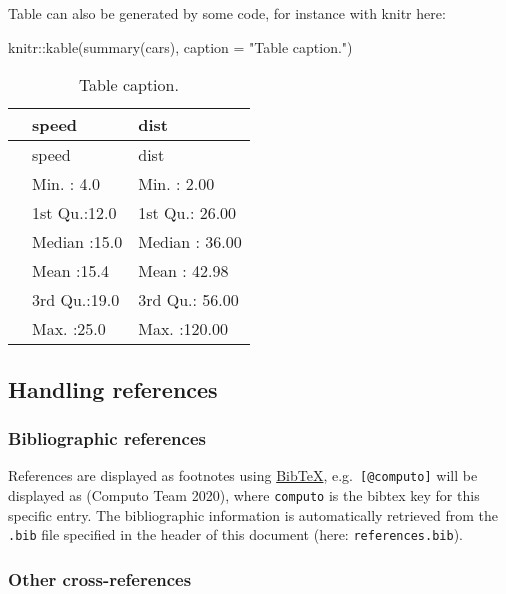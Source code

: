 \documentclass[
  11pt,
  a4paper,
]{article}
\newenvironment{Shaded}{}{}
\newcommand{\AttributeTok}[1]{\textcolor[rgb]{0.84,0.23,0.29}{#1}}
\newcommand{\FunctionTok}[1]{\textcolor[rgb]{0.44,0.26,0.76}{#1}}
\newcommand{\NormalTok}[1]{\textcolor[rgb]{0.14,0.16,0.18}{#1}}
\newcommand{\SpecialCharTok}[1]{\textcolor[rgb]{0.00,0.36,0.77}{#1}}
\newcommand{\StringTok}[1]{\textcolor[rgb]{0.01,0.18,0.38}{#1}}
\theoremstyle{plain}
\theoremstyle{remark}
\begin{document}
Table can also be generated by some code, for instance with knitr here:

\begin{Shaded}
\begin{Highlighting}[]
\NormalTok{knitr}\SpecialCharTok{::}\FunctionTok{kable}\NormalTok{(}\FunctionTok{summary}\NormalTok{(cars), }\AttributeTok{caption =} \StringTok{"Table caption."}\NormalTok{)}
\end{Highlighting}
\end{Shaded}

\begin{longtable}[]{@{}lll@{}}
\caption{Table caption.}\tabularnewline
\toprule()
& speed & dist \\
\midrule()
\endfirsthead
\toprule()
& speed & dist \\
\midrule()
\endhead
& Min. : 4.0 & Min. : 2.00 \\
& 1st Qu.:12.0 & 1st Qu.: 26.00 \\
& Median :15.0 & Median : 36.00 \\
& Mean :15.4 & Mean : 42.98 \\
& 3rd Qu.:19.0 & 3rd Qu.: 56.00 \\
& Max. :25.0 & Max. :120.00 \\
\bottomrule()
\end{longtable}

\hypertarget{sec-references}{%
\subsection{Handling references}\label{sec-references}}

\hypertarget{bibliographic-references}{%
\subsubsection{Bibliographic
references}\label{bibliographic-references}}

References are displayed as footnotes using
\href{http://www.bibtex.org/}{BibTeX}, e.g.~\texttt{{[}@computo{]}} will
be displayed as (Computo Team 2020), where \texttt{computo} is the
bibtex key for this specific entry. The bibliographic information is
automatically retrieved from the \texttt{.bib} file specified in the
header of this document (here: \texttt{references.bib}).

\hypertarget{other-cross-references}{%
\subsubsection{Other cross-references}\label{other-cross-references}}
\end{document}
